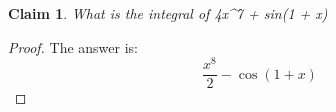 \documentclass{article}
\newtheorem{theorem}{Claim}
\begin{document}
\begin{theorem}
What is the integral of 4x^7 + sin(1 + x)
\end{theorem}

\begin{proof}
The answer is:
\[
\frac{x^8}{2} - \cos(1+x)
\]
\end{proof}
\end{document}
